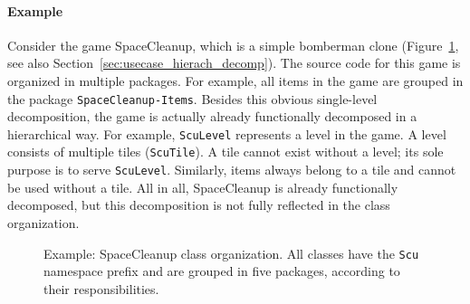 \paragraph{Example}
Consider the game SpaceCleanup, which is a simple bomberman clone (Figure~\ref{fig:prob_space_cleanup_org}, see also Section~\ref{sec:usecase_hierach_decomp}). The source code for this game is organized in multiple packages. For example, all items in the game are grouped in the package \texttt{SpaceCleanup-Items}. Besides this obvious single-level decomposition, the game is actually already functionally decomposed in a hierarchical way. For example, \texttt{ScuLevel} represents a level in the game. A level consists of multiple tiles (\texttt{ScuTile}). A tile cannot exist without a level; its sole purpose is to serve \texttt{ScuLevel}. Similarly, items always belong to a tile and cannot be used without a tile. All in all, SpaceCleanup is already functionally decomposed, but this decomposition is not fully reflected in the class organization.

\begin{figure}[!htp]
\vspace{10pt}
\vspace{10pt}
\vspace{10pt}
\vspace{10pt}
\caption[Example: SpaceCleanup class organization]{Example: SpaceCleanup class organization. All classes have the \texttt{Scu} namespace prefix and are grouped in five packages, according to their responsibilities.}
\label{fig:prob_space_cleanup_org}
\end{figure}


